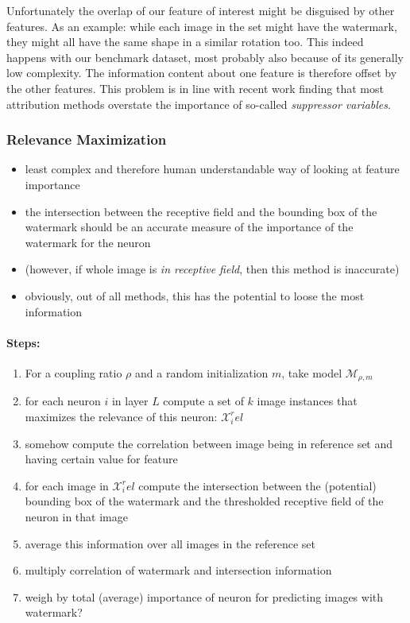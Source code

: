 Unfortunately the overlap of our feature of interest might be disguised by other features. As an example: while each image in the set might have the watermark, they might all have the same shape in a similar rotation too. This indeed happens with our benchmark dataset, most probably also because of its generally low complexity.  The information content about one feature is therefore offset by the other features. This problem is in line with recent work finding that most attribution methods overstate the importance of so-called \textit{suppressor variables}. 

\subsubsection{Relevance Maximization}
\begin{itemize}
    \item least complex and therefore human understandable way of looking at feature importance
    \item the intersection between the receptive field and the bounding box of the watermark should be an accurate measure of the importance of the watermark for the neuron
    \item (however, if whole image is \textit{in receptive field}, then this method is inaccurate)
    \item obviously, out of all methods, this has the potential to loose the most information
\end{itemize}

\paragraph{Steps:}
\begin{enumerate}
    \item For a coupling ratio $\rho$ and a random initialization $m$, take model $\mathcal{M}_{\rho, m}$
    \item for each neuron $i$ in layer $L$ compute a set of $k$ image instances that maximizes the relevance of this neuron: $\mathcal{X}_{i}^rel$ 
    \item somehow compute the correlation between image being in reference set and having certain value for feature 
    \item for each image in $\mathcal{X}_{i}^rel$ compute the intersection between the (potential) bounding box of the watermark and the thresholded receptive field of the neuron in that image
    \item average this information over all images in the reference set
    \item multiply correlation of watermark and intersection information
    \item weigh by total (average) importance of neuron for predicting images with watermark? 
\end{enumerate}

